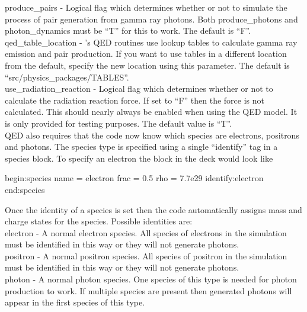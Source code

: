 {\emphtext produce\_pairs} - Logical flag which determines whether or not to
  simulate the process of pair generation from gamma ray photons.  Both
  produce\_photons and photon\_dynamics must be ``T'' for this to work. The
  default is ``F''.\\

{\emphtext qed\_table\_location} - {\EPOCH}'s QED routines use lookup tables to
  calculate gamma ray emission and pair production. If you want to use tables
  in a different location from the default, specify the new location using
  this parameter.  The default is ``src/physics\_packages/TABLES''.\\

{\emphtext use\_radiation\_reaction} - Logical flag which determines whether
  or not to calculate the radiation reaction force. If set to ``F'' then
  the force is not calculated. This should nearly always be enabled when
  using the QED model. It is only provided for testing purposes.
  The default value is ``T''.\\

QED also requires that the code now know which species are electrons,
positrons and photons. The species type is specified using a single
``identify'' tag in a species block. To specify an electron the block in the
deck would look like

\begin{boxverbatim}
begin:species
   name = electron
   frac = 0.5
   rho = 7.7e29
   identify:electron
end:species
\end{boxverbatim}

Once the identity of a species is set then the code automatically assigns
mass and charge states for the species.
Possible identities are:\\

{\emphtext electron} - A normal electron species. All species of electrons in
  the simulation must be identified in this way or they will not generate
  photons.\\

{\emphtext positron} - A normal positron species. All species of positron in
  the simulation must be identified in this way or they will not generate
  photons.\\

{\emphtext photon} - A normal photon species. One species of this type is
  needed for photon production to work. If multiple species are present then
  generated photons will appear in the first species of this type.\\

